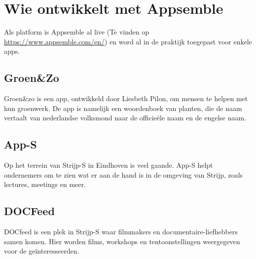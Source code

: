 \chapter{Wie ontwikkelt met Appsemble}


Als platform is Appsemble al live (Te vinden op \href{https://www.appsemble.com/en/}{https://www.appsemble.com/en/}) en word al in de praktijk toegepast voor enkele apps.

\section{Groen\&Zo}

Groen\&zo is een app, ontwikkeld door Liesbeth Pilon, om mensen te helpen met hun groenwerk. De app is namelijk een woordenboek van planten, die de naam vertaalt van nederlandse volksmond naar de officie\"{e}le naam en de engelse naam.

\section{App-S}

Op het terrein van Strijp-S in Eindhoven is veel gaande. App-S helpt ondernemers om te zien wat er aan de hand is in de omgeving van Strijp, zoals lectures, meetings en meer.

\section{DOCFeed}

DOCfeed is een plek in Strijp-S waar filmmakers en documentaire-liefhebbers samen komen. Hier worden films, workshops en tentoonstellingen weergegeven voor de ge\"{i}nteresseerden.